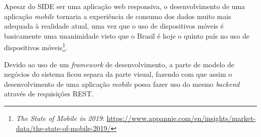 Apesar do SIDE ser uma aplicação web responsiva, o desenvolvimento de uma aplicação \textit{mobile} tornaria a experiência de consumo dos dados muito mais adequada à realidade atual, uma vez que o uso de dispositivos móveis é basicamente uma unanimidade visto que o Brasil é hoje o quinto país no uso de dispositivos móveis\footnote{\textit{The State of Mobile in 2019}: \url{https://www.appannie.com/en/insights/market-data/the-state-of-mobile-2019/}}.

Devido ao uso de um \textit{framework} de desenvolvimento, a parte de modelo de negócios do sistema ficou separa da parte visual, fazendo com que assim o desenvolvimento de uma aplicação \textit{mobile} possa fazer uso do mesmo \textit{backend} através de requisições REST.
